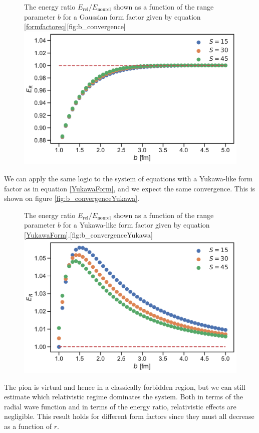 \begin{figure}[H]
	\begin{sidecaption}{The energy ratio $E_\text{rel}/E_\text{nonrel}$ shown as a function of the range parameter $b$ for a Gaussian form factor given by equation \eqref{formfactoreq}}[fig:b_convergence]
		\includegraphics[width=\linewidth]{Figures/bconvergence.pdf}
	\end{sidecaption}
\end{figure}
We can apply the same logic to the system of equations with a Yukawa-like form factor as in equation \eqref{YukawaForm}, and we expect the same convergence. This is shown on figure \ref{fig:b_convergenceYukawa}.
\begin{figure}[H]
	\begin{sidecaption}{The energy ratio $E_\text{rel}/E_\text{nonrel}$ shown as a function of the range parameter $b$ for a Yukawa-like form factor given by equation \eqref{YukawaForm}.}[fig:b_convergenceYukawa]
		\includegraphics[width=\linewidth]{Figures/bconvergenceYukawa.pdf}
	\end{sidecaption}
\end{figure}
The pion is virtual and hence in a classically forbidden region, but we can still estimate which relativistic regime dominates the system. Both in terms of the radial wave function and in terms of the energy ratio, relativistic effects are negligible. This result holds for different form factors since they must all decrease as a function of $r$. 

